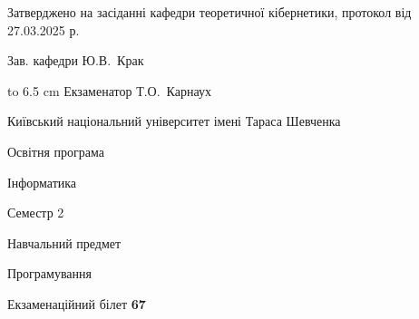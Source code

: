 \documentclass[12pt, ukrainian]{article}
\begin{document}
{\smallskip\smallskip \begin {scriptsize} Затверджено на засіданні кафедри теоретичної кібернетики, протокол   від   27.03.2025 р.\par\smallskip\smallskip\smallskip\smallskip
{\parbox {6.5 cm} {Зав. кафедри \dotfill Ю.В.~Крак}}\hspace {0.7cm} {\hbox to 6.5 cm { Екзаменатор \dotfill Т.О.~Карнаух}} \end{scriptsize}}
\newpage
{{\begin {scriptsize}\par
{ \center  Київський національний університет імені Тараса Шевченка \par}
{\parbox {5 cm}{Освітня програма \hfill}{\parbox {7 cm}{Інформатика\hfill}}\parbox {6 cm}{\hfill Семестр 2}}\par
{\parbox {5 cm} {Навчальний предмет \hfill}\parbox {7 cm}{Програмування \hfill}\parbox {6cm}{\hfill}\par}\vspace{-15pt} \end{scriptsize}}{\center Екзаменаційний білет \No \textbf { 67 }\par}}
\end{document}
